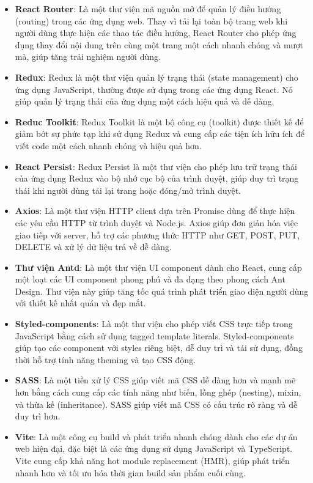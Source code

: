 \begin{itemize}
    \item \textbf{React Router}: Là một thư viện mã nguồn mở để quản lý điều hướng (routing) trong các ứng dụng
    web. Thay vì tải lại toàn bộ trang web khi người dùng thực hiện các thao tác điều hướng, React
    Router cho phép ứng dụng thay đổi nội dung trên cùng một trang một cách nhanh chóng và mượt
    mà, giúp tăng trải nghiệm người dùng.
    \item \textbf{Redux}: Redux là một thư viện quản lý trạng thái (state management) cho ứng dụng JavaScript, thường được sử dụng trong các ứng dụng React. Nó giúp quản lý trạng thái của ứng dụng một cách hiệu quả và dễ dàng.
    \item \textbf{Reduc Toolkit}: Redux Toolkit là một bộ công cụ (toolkit) được thiết kế để giảm bớt sự phức tạp khi sử dụng Redux và cung cấp các tiện ích hữu ích để viết code một cách nhanh chóng và hiệu quả hơn. 
    \item \textbf{React Persist}: Redux Persist là một thư viện cho phép lưu trữ trạng thái của ứng dụng Redux vào bộ nhớ cục bộ của trình duyệt, giúp duy trì trạng thái khi người dùng tải lại trang hoặc đóng/mở trình duyệt.
    \item \textbf{Axios}: Là một thư viện HTTP client dựa trên Promise dùng để thực hiện các yêu cầu HTTP từ trình duyệt và Node.js. Axios giúp đơn giản hóa việc giao tiếp với server, hỗ trợ các phương thức HTTP như GET, POST, PUT, DELETE và xử lý dữ liệu trả về dễ dàng.
    \item \textbf{Thư viện Antd}: Là một thư viện UI component dành cho React, cung cấp một loạt các UI component phong phú và đa dạng theo phong cách Ant Design. Thư viện này giúp tăng tốc quá trình phát triển giao diện người dùng với thiết kế nhất quán và đẹp mắt.
    \item \textbf{Styled-components}: Là một thư viện cho phép viết CSS trực tiếp trong JavaScript bằng cách sử dụng tagged template literals. Styled-components giúp tạo các component với styles riêng biệt, dễ duy trì và tái sử dụng, đồng thời hỗ trợ tính năng theming và tạo CSS động.
    \item \textbf{SASS}: Là một tiền xử lý CSS giúp viết mã CSS dễ dàng hơn và mạnh mẽ hơn bằng cách cung cấp các tính năng như biến, lồng ghép (nesting), mixin, và thừa kế (inheritance). SASS giúp viết mã CSS có cấu trúc rõ ràng và dễ duy trì hơn.
    \item \textbf{Vite}: Là một công cụ build và phát triển nhanh chóng dành cho các dự án web hiện đại, đặc biệt là các ứng dụng sử dụng JavaScript và TypeScript. Vite cung cấp khả năng hot module replacement (HMR), giúp phát triển nhanh hơn và tối ưu hóa thời gian build sản phẩm cuối cùng.

\end{itemize}
